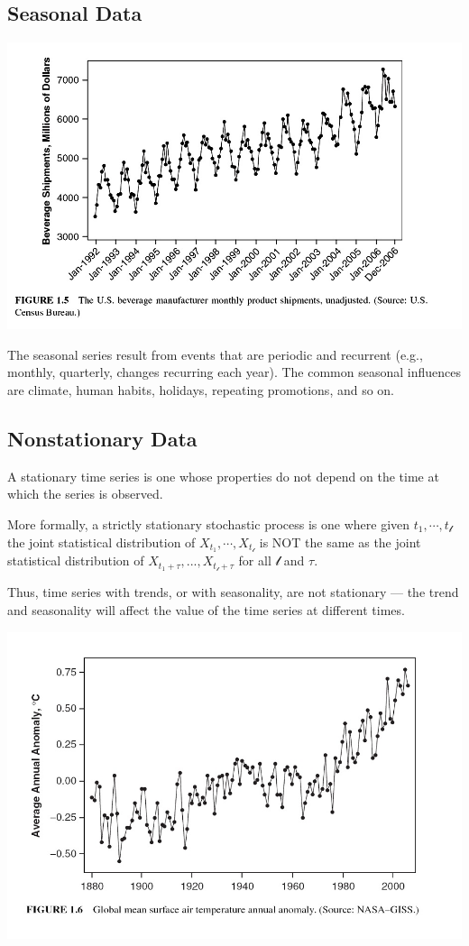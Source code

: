 \documentclass[
]{book}
\begin{document}
\hypertarget{seasonal-data}{%
\subsection{Seasonal Data}\label{seasonal-data}}

\begin{center}\includegraphics[width=0.8\linewidth]{img11/w11-Figure05} \end{center}

The seasonal series result from events that are periodic and recurrent (e.g., monthly, quarterly, changes recurring each year). The common seasonal influences are climate, human habits, holidays, repeating promotions, and so on.

\hypertarget{nonstationary-data}{%
\subsection{Nonstationary Data}\label{nonstationary-data}}

A stationary time series is one whose properties do not depend on the time at which the series is observed.

More formally, a strictly stationary stochastic process is one where given \(t_1, \cdots, t_{\mathcal{l}}\) the joint statistical distribution of \(X_{t_1} , \cdots ,X_{t_{\mathcal{l}}}\) is NOT the same as the joint statistical distribution of \(X_{t_1 + \tau} , . . . ,X_{t_{\mathcal{l}}+\tau}\) for all \(\mathcal{l}\) and \(\tau\).

Thus, time series with trends, or with seasonality, are not stationary --- the trend and seasonality will affect the value of the time series at different times.

\begin{center}\includegraphics[width=0.8\linewidth]{img11/w11-Figure06} \end{center}
\end{document}
